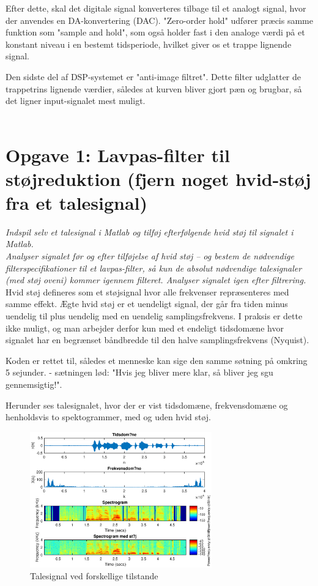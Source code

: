 \documentclass[a4paper]{report}
\begin{document}
Efter dette, skal det digitale signal konverteres tilbage til et analogt signal, hvor der anvendes en DA-konvertering (DAC). 
"Zero-order hold" udfører præcis samme funktion som "sample and hold", som også holder fast i den analoge værdi på et konstant niveau i en bestemt tidsperiode, hvilket giver os et trappe lignende signal.  

Den sidste del af DSP-systemet er "anti-image filtret". Dette filter udglatter de trappetrins lignende værdier, således at kurven bliver gjort pæn og brugbar, så det ligner input-signalet mest muligt.\\
\\

\section*{Opgave 1: Lavpas-filter til støjreduktion (fjern noget hvid-støj fra et talesignal)}
\textit{Indspil selv et talesignal i Matlab og tilføj efterfølgende hvid støj til signalet i Matlab.\\ 
Analyser signalet før og efter tilføjelse af hvid støj – og bestem de nødvendige filterspecifikationer til et lavpas-filter, så kun de absolut nødvendige talesignaler (med støj oveni) kommer igennem filteret.
Analyser signalet igen efter filtrering.}\\

Hvid støj defineres som et støjsignal hvor alle frekvenser repræsenteres med samme effekt. Ægte hvid støj er et uendeligt signal, der går fra tiden minus uendelig til plus uendelig med en uendelig samplingsfrekvens. I praksis er dette ikke muligt, og man arbejder derfor kun med et endeligt tidsdomæne hvor signalet har en begrænset båndbredde til den halve samplingsfrekvens (Nyquist). 

Koden er rettet til, således et menneske kan sige den samme søtning på omkring 5 sejunder. - sætningen lød: "Hvis jeg bliver mere klar, så bliver jeg sgu gennemsigtig!". 

Herunder ses talesignalet, hvor der er vist tidsdomæne, frekvensdomæne og henholdsvis to spektogrammer, med og uden hvid støj.

\begin{figure}[H] 
\centering
\includegraphics[width=0.7\textwidth]{grafer/White_noise_60}
\caption{Talesignal ved forskellige tilstande} \label{White_noise_60}
\end{figure}
\end{document}
